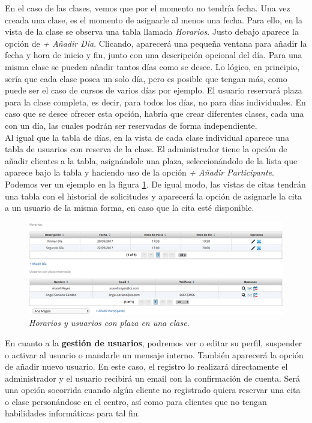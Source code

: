 En el caso de las clases, vemos que por el momento no tendría fecha. Una vez creada una clase, es el momento de asignarle al menos una fecha. Para ello, en la vista de la clase se observa una tabla llamada \textit{Horarios}. Justo debajo aparece la opción de \textit{+ Añadir Día}. Clicando, aparecerá una pequeña ventana para añadir la fecha y hora de inicio y fin, junto con una descripción opcional del día. Para una misma clase se pueden añadir tantos días como se desee. Lo lógico, en principio, sería que cada clase posea un solo día, pero es posible que tengan más, como puede ser el caso de cursos de varios días por ejemplo. El usuario reservará plaza para la clase completa, es decir, para todos los días, no para días individuales. En caso que se desee ofrecer esta opción, habría que crear diferentes clases, cada una con un día, las cuales podrán ser reservadas de forma independiente. \\

Al igual que la tabla de días, en la vista de cada clase individual aparece una tabla de usuarios con reserva de la clase. El administrador tiene la opción de añadir clientes a la tabla, asignándole una plaza, seleccionándolo de la lista que aparece bajo la tabla y haciendo uso de la opción \textit{+ Añadir Participante}. Podemos ver un ejemplo en la figura \ref{fig:horarios-y-usuarios-clase}. De igual modo, las vistas de citas tendrán una tabla con el historial de solicitudes y aparecerá la opción de asignarle la cita a un usuario de la misma forma, en caso que la cita esté disponible. \\

\begin{figure}
\centering
  \includegraphics[scale=.60]{img/manual/horarios-y-usuarios-clase.jpg}
  \caption{\textit{Horarios y usuarios con plaza en una clase.}}
  \label{fig:horarios-y-usuarios-clase}
\end{figure}

En cuanto a la \textbf{gestión de usuarios}, podremos ver o editar su perfil, suspender o activar al usuario o mandarle un mensaje interno. También aparecerá la opción de añadir nuevo usuario. En este caso, el registro lo realizará directamente el administrador y el usuario recibirá un email con la confirmación de cuenta. Será una opción socorrida cuando algún cliente no registrado quiera reservar una cita o clase personándose en el centro, así como para clientes que no tengan habilidades informáticas para tal fin. \\ 

